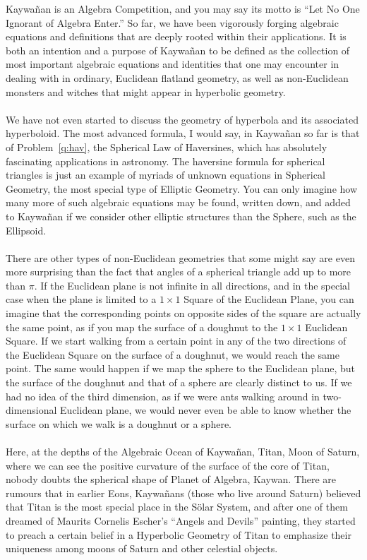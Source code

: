 \begin{tcolorbox}[title={Swimming the Depths of the Algebraic Ocean}]
    Kaywañan is an Algebra Competition, and you may say its motto is ``Let No One Ignorant of Algebra Enter.''  So far, we have been vigorously forging algebraic equations and definitions that are deeply rooted within their applications. It is both an intention and a purpose of Kaywañan to be defined as the collection of most important algebraic equations and identities that one may encounter in dealing with in ordinary, Euclidean flatland geometry, as well as non-Euclidean monsters and witches that might appear in hyperbolic geometry. \\
    \\
    We have not even started to discuss the geometry of hyperbola and its associated hyperboloid. The most advanced formula, I would say, in Kaywañan so far is that of Problem~\ref{q:hav}, the Spherical Law of Haversines, which has absolutely fascinating applications in astronomy. The haversine formula for spherical triangles is just an example of myriads of unknown equations in Spherical Geometry, the most special type of Elliptic Geometry. You can only imagine how many more of such algebraic equations may be found, written down, and added to Kaywañan if we consider other elliptic structures than the Sphere, such as the Ellipsoid.\\
    \\
    There are other types of non-Euclidean geometries that some might say are even more surprising than the fact that angles of a spherical triangle add up to more than $\pi$. If the Euclidean plane is not infinite in all directions, and in the special case when the plane is limited to a $1\times 1$ Square of the Euclidean Plane, you can imagine that the corresponding points on opposite sides of the square are actually the same point, as if you map the surface of a doughnut to the $1\times 1$ Euclidean Square. If we start walking from a certain point in any of the two directions of the Euclidean Square on the surface of a doughnut, we would reach the same point. The same would happen if we map the sphere to the Euclidean plane, but the surface of the doughnut and that of a sphere are clearly distinct to us. If we had no idea of the third dimension, as if we were ants walking around in two-dimensional Euclidean plane, we would never even be able to know whether the surface on which we walk is a doughnut or a sphere.\\
    \\
    Here, at the depths of the Algebraic Ocean of Kaywañan, Titan, Moon of Saturn, where we can see the positive curvature of the surface of the core of Titan, nobody doubts the spherical shape of Planet of Algebra, Kaywan. There are rumours that in earlier Eons, Kaywañans (those who live around Saturn) believed that Titan is the most special place in the S\"olar System, and after one of them dreamed of Maurits Cornelis Escher's ``Angels and Devils'' painting, they started to preach a certain belief in a Hyperbolic Geometry of Titan to emphasize their uniqueness among moons of Saturn and other celestial objects.\\

\end{tcolorbox}
